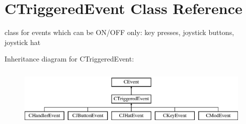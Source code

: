 \hypertarget{classCTriggeredEvent}{\section{C\-Triggered\-Event Class Reference}
\label{classCTriggeredEvent}
}


class for events which can be O\-N/\-O\-F\-F only\-: key presses, joystick buttons, joystick hat  


Inheritance diagram for C\-Triggered\-Event\-:\begin{figure}[H]
\begin{center}
\leavevmode
\includegraphics[height=2.896552cm]{classCTriggeredEvent}
\end{center}
\end{figure}
